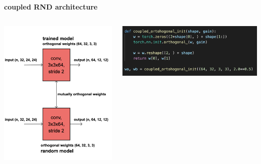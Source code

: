 \documentclass{beamer}
\begin{document}
  \begin{frame}{\bf coupled RND architecture}
  
    \begin{columns}
    
        \begin{column}{0.5\textwidth}
          \includegraphics[scale=0.18]{../diagrams/rnd/coupledrnd.png}
        \end{column}
    
        \begin{column}{0.5\textwidth}
          \includegraphics[scale=0.32]{../images/coupled_orthogonal.png}
        \end{column}
    
    \end{columns}
    
  \end{frame}
\end{document}
